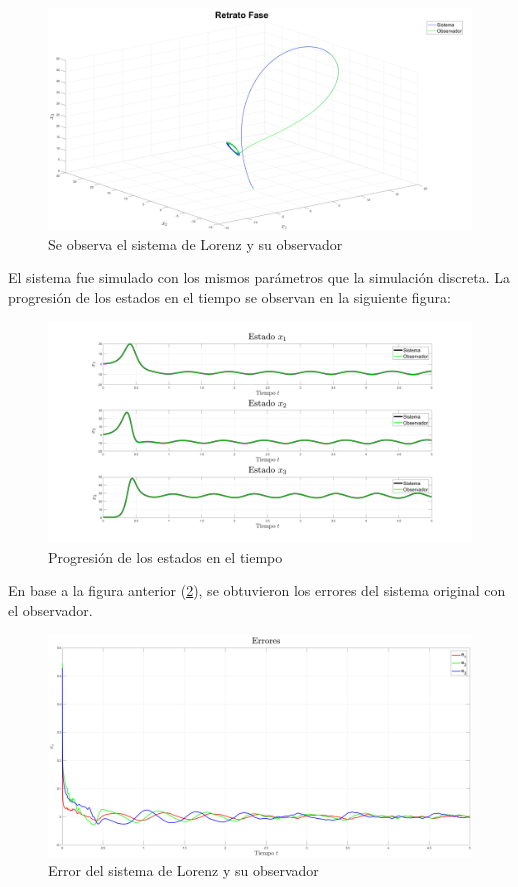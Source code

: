 \begin{figure}[H]
	\centering
	\includegraphics[width=150mm]{img/E1_RetratoFase_Cont.png}
	\caption{Se observa el sistema de Lorenz y su observador}
	\label{img:lorenzD4}
\end{figure}

El sistema fue simulado con los mismos parámetros que la simulación discreta. La progresión de los estados en el tiempo se observan en la siguiente figura:

\begin{figure}[H]
	\centering
	\includegraphics[width=150mm]{img/E1_Estados_Cont.png}
	\caption{Progresión de los estados en el tiempo}
	\label{img:lorenzD5}
\end{figure}

En base a la figura anterior (\ref{img:lorenzD5}), se obtuvieron los errores del sistema original con el observador.

\begin{figure}[H]
	\centering
	\includegraphics[width=150mm]{img/E1_Errores_Cont.png}
	\caption{Error del sistema de Lorenz y su observador}
	\label{img:lorenzD6}
\end{figure}

